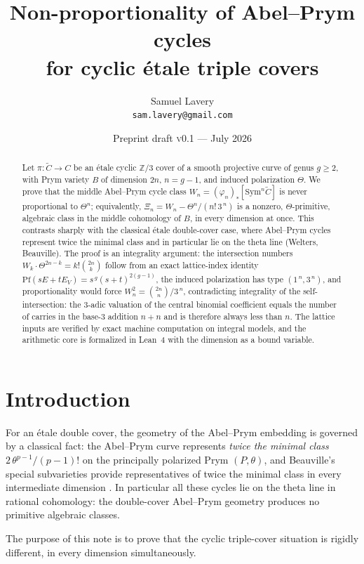 \documentclass[11pt]{article}
\title{Non-proportionality of Abel--Prym cycles\\ for cyclic \'etale triple covers}
\author{Samuel Lavery\\ \texttt{sam.lavery@gmail.com}}
\date{Preprint draft \textsc{v0.1} --- July 2026}
\newcommand{\Z}{\mathbb{Z}}
\newcommand{\Pf}{\mathrm{Pf}}
\begin{document}
\maketitle

\begin{abstract}
Let $\pi\colon \widetilde C\to C$ be an \'etale cyclic $\Z/3$ cover of a smooth
projective curve of genus $g\ge 2$, with Prym variety $B$ of dimension
$2n$, $n=g-1$, and induced polarization $\Theta$.  We prove that the middle
Abel--Prym cycle class $W_n=(\varphi_n)_*[\mathrm{Sym}^n\widetilde C]$ is never
proportional to $\Theta^n$; equivalently,
$\Xi_n = W_n - \Theta^n/(n!\,3^{\,n})$ is a nonzero, $\Theta$-primitive,
algebraic class in the middle cohomology of $B$, in every dimension at once.
This contrasts sharply with the classical \'etale double-cover case, where
Abel--Prym cycles represent twice the minimal class and in particular lie on
the theta line (Welters, Beauville).  The proof is an integrality argument:
the intersection numbers $W_k\cdot\Theta^{2n-k}=k!\binom{2n}{k}$ follow from
an exact lattice-index identity
$\Pf(sE+tE_V)=s^{\,g}(s+t)^{2(g-1)}$, the induced polarization has type
$(1^{\,n},3^{\,n})$, and proportionality would force
$W_n^2=\binom{2n}{n}/3^{\,n}$, contradicting integrality of the
self-intersection: the $3$-adic valuation of the central binomial coefficient
equals the number of carries in the base-$3$ addition $n+n$ and is therefore
always less than $n$.  The lattice inputs are verified by exact machine
computation on integral models, and the arithmetic core is formalized in Lean~4
with the dimension as a bound variable.
\end{abstract}

\section{Introduction}

For an \'etale double cover, the geometry of the Abel--Prym embedding is
governed by a classical fact: the Abel--Prym curve represents \emph{twice the
minimal class} $2\,\theta^{p-1}/(p-1)!$ on the principally polarized Prym
$(P,\theta)$, and Beauville's special subvarieties provide representatives of
twice the minimal class in every intermediate dimension
\cite{Beauville82,Welters87}.  In particular all these cycles lie on the theta
line in rational cohomology: the double-cover Abel--Prym geometry produces no
primitive algebraic classes.

The purpose of this note is to prove that the cyclic triple-cover situation is
rigidly different, in every dimension simultaneously.
\end{document}
